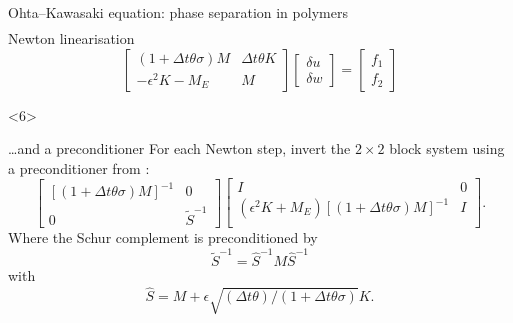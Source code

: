 \documentclass[presentation,aspectratio=43, 10pt]{beamer}
\begin{document}
\begin{frame}[t]
\begin{onlyenv}
\begin{block}{Ohta--Kawasaki equation: phase separation in
        polymers}
\begin{equation*}
\begin{split}
        \end{split}
      \end{equation*}
      Newton linearisation
      \begin{equation*}
        \begin{bmatrix}
          (1 + \Delta t \theta \sigma)M  & \Delta t\theta K \\
          -\epsilon^2 K - M_E & M
        \end{bmatrix}
        \begin{bmatrix}
          \delta u \\
          \delta w
        \end{bmatrix} =
        \begin{bmatrix}
          f_1 \\
          f_2
        \end{bmatrix}
      \end{equation*}
    \end{block}
  \end{onlyenv}
  \begin{onlyenv}<6>
    \begin{block}{\dots and a preconditioner}
      For each Newton step, invert the $2\times 2$ block system using
      a preconditioner from \textcite{Farrell:2017}:
      \begin{equation*}
        \begin{bmatrix}
          \left[(1 + \Delta t \theta \sigma)M\right]^{-1}  & 0 \\
          0 & \widetilde{S}^{-1}
        \end{bmatrix}
        \begin{bmatrix}
          I & 0\\
          (\epsilon^2 K + M_E)\left[(1 + \Delta t \theta
              \sigma)M\right]^{-1} & I\\
        \end{bmatrix}.
      \end{equation*}
      Where the Schur complement is preconditioned by
      \begin{equation*}
        \tilde{S}^{-1} = \hat{S}^{-1}M\hat{S}^{-1}
      \end{equation*}
      with
      \begin{equation*}
        \hat{S} = M + \epsilon\sqrt{(\Delta t \theta)/(1+\Delta t \theta\sigma)} K.
      \end{equation*}
    \end{block}
  \end{onlyenv}

\end{frame}
\end{document}

